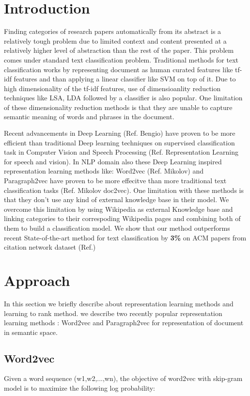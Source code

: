 \documentclass[runningheads,a4paper]{llncs}
\begin{document}
\section{Introduction}
Finding categories of research papers automatically from its abstract is a relatively tough problem due to limited context and content presented at a relatively higher level of abstraction than the rest of the paper. This problem comes under standard text classification problem. Traditional methods for text classification works by representing document as human curated features like tf-idf features and than applying a linear classifier like SVM on top of it. Due to high dimensionality of the tf-idf features, use of dimensioanlity reduction techniques like LSA, LDA followed by a classifier is also popular. One limitation of these dimensionality reduction methods is that they are unable to capture semantic meaning of words and phrases in the document.
 
Recent advancements in Deep Learning (Ref. Bengio) have proven to be more efficient than traditional Deep learning techniques on supervised classification task in Computer Vision and Speech Processing (Ref. Representation Learning for speech and vision). In NLP domain also these Deep Learning inspired representation learning methods like: Word2vec (Ref. Mikolov) and Paragraph2vec have proven to be more effecitve than more traditional text classification tasks (Ref. Mikolov doc2vec). One limitation with these methods is that they don't use any kind of external knowledge base in their model. We overcome this limitation by using Wikipedia as external Knowledge base and linking categories to their correspoding Wikipedia pages and combining both of them to build a classification model. We show that our method outperforms recent State-of-the-art method for text classification by {\bf 3\%} on ACM papers from citation network dataset (Ref.)

\section{Approach}

In this section we briefly describe about representation learning methods and learning to rank method. we describe two recently popular representation learning methods : Word2vec and Paragraph2vec for representation of document in semantic space. 

\subsection{Word2vec}
Given a word sequence (w1,w2,...,wn), the objective of word2vec with skip-gram model is to maximize the following log probability:
\end{document}
